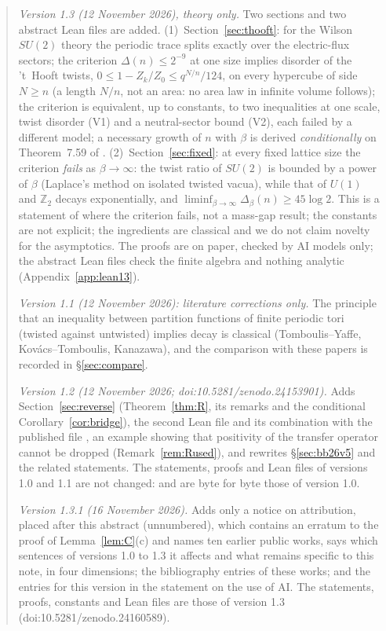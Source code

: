 \documentclass[11pt,a4paper]{article}
\theoremstyle{plain}
\theoremstyle{definition}
\theoremstyle{remark}
\numberwithin{equation}{section}
\newcommand{\Z}{\mathbb{Z}}
\begin{document}
\begin{abstract}
\emph{Version 1.3 (12 November 2026), theory only.} Two sections and two abstract Lean files are added. (1)~Section~\ref{sec:thooft}: for the Wilson $SU(2)$ theory the periodic trace splits exactly over the electric-flux sectors; the criterion $\Delta(n)\le2^{-9}$ at one size implies disorder of the 't~Hooft twists, $0\le1-Z_k/Z_0\le q^{N/n}/124$, on every hypercube of side $N\ge n$ (a length $N/n$, not an area: no area law in infinite volume follows); the criterion is equivalent, up to constants, to two inequalities at one scale, twist disorder (V1) and a neutral-sector bound (V2), each failed by a different model; a necessary growth of $n$ with $\beta$ is derived \emph{conditionally} on Theorem~7.59 of \cite{BB26v5}. (2)~Section~\ref{sec:fixed}: at every fixed lattice size the criterion \emph{fails} as $\beta\to\infty$: the twist ratio of $SU(2)$ is bounded by a power of $\beta$ (Laplace's method on isolated twisted vacua), while that of $U(1)$ and $\Z_2$ decays exponentially, and $\liminf_{\beta\to\infty}\Delta_\beta(n)\ge45\log2$. This is a statement of where the criterion fails, not a mass-gap result; the constants are not explicit; the ingredients are classical and we do not claim novelty for the asymptotics. The proofs are on paper, checked by AI models only; the abstract Lean files check the finite algebra and nothing analytic (Appendix~\ref{app:lean13}).

\emph{Version 1.1 (12 November 2026): literature corrections only.} The principle that an inequality between partition functions of finite periodic tori (twisted against untwisted) implies decay is classical (Tomboulis--Yaffe, Kov\'acs--Tomboulis, Kanazawa), and the comparison with these papers is recorded in \S\ref{sec:compare}.

\emph{Version 1.2 (12 November 2026; doi:10.5281/zenodo.24153901).} Adds Section~\ref{sec:reverse} (Theorem~\ref{thm:R}, its remarks and the conditional Corollary~\ref{cor:bridge}), the second Lean file  and its combination with the published file , an example showing that positivity of the transfer operator cannot be dropped (Remark~\ref{rem:Rused}), and rewrites \S\ref{sec:bb26v5} and the related statements. The statements, proofs and Lean files of versions 1.0 and 1.1 are not changed:  and  are byte for byte those of version 1.0.

\emph{Version 1.3.1 (16 November 2026).} Adds only a notice on attribution, placed after this abstract (unnumbered), which contains an erratum to the proof of Lemma~\ref{lem:C}(c) and names ten earlier public works, says which sentences of versions 1.0 to 1.3 it affects and what remains specific to this note, in four dimensions; the bibliography entries of these works; and the entries for this version in the statement on the use of AI. The statements, proofs, constants and Lean files are those of version 1.3 (doi:10.5281/zenodo.24160589).


\end{abstract}
\end{document}
